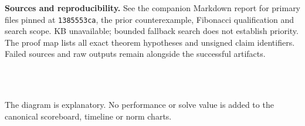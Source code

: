 \documentclass[10pt]{article}
\begin{document}
\textbf{Sources and reproducibility.} See the companion Markdown report for
primary files pinned at \texttt{1385553ca}, the prior counterexample,
Fibonacci qualification and search scope. KB unavailable; bounded fallback
search does not establish priority. The proof map lists all exact theorem
hypotheses and unsigned claim identifiers. Failed sources and raw outputs
remain alongside the successful artifacts.

\\
\\

The diagram is explanatory. No performance or solve value is added to the
canonical scoreboard, timeline or norm charts.
\end{document}
